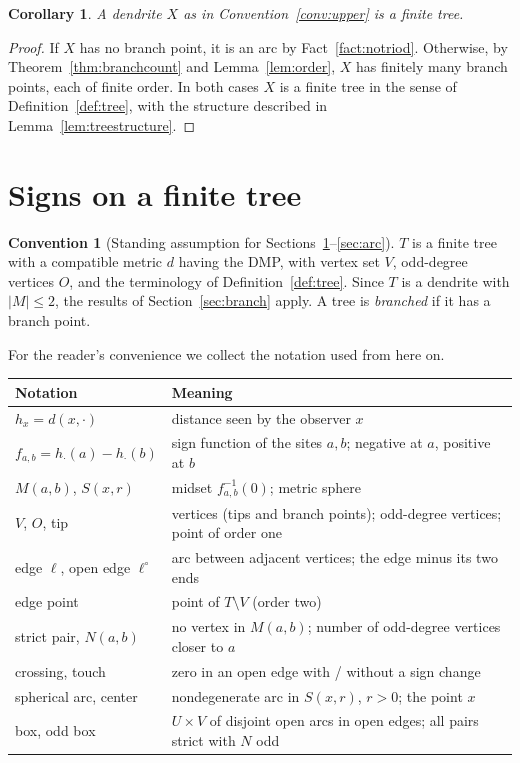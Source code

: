 \documentclass[11pt]{amsart}
\newtheorem{corollary}[theorem]{Corollary}
\theoremstyle{definition}
\newtheorem{convention}[theorem]{Convention}
\theoremstyle{remark}
\newcommand{\M}{M}
\newcommand{\Odd}{O}
\newcommand{\Ver}{V}
\newcommand{\N}{N}
\begin{document}
\begin{corollary}\label{cor:finitetree}
A dendrite $X$ as in Convention~\ref{conv:upper} is a finite tree.
\end{corollary}
\begin{proof}
If $X$ has no branch point, it is an arc by Fact~\ref{fact:notriod}. Otherwise, by Theorem~\ref{thm:branchcount} and Lemma~\ref{lem:order}, $X$ has finitely many branch points, each of finite order. In both cases $X$ is a finite tree in the sense of Definition~\ref{def:tree}, with the structure described in Lemma~\ref{lem:treestructure}.
\end{proof}

\section{Signs on a finite tree}\label{sec:signs}

\begin{convention}[Standing assumption for Sections~\ref{sec:signs}--\ref{sec:arc}]\label{conv:tree}
$T$ is a finite tree with a compatible metric $d$ having the DMP, with vertex set $\Ver$, odd-degree vertices $\Odd$, and the terminology of Definition~\ref{def:tree}. Since $T$ is a dendrite with $|\M|\le2$, the results of Section~\ref{sec:branch} apply. A tree is \emph{branched} if it has a branch point.
\end{convention}

For the reader's convenience we collect the notation used from here on.
\begin{center}
\small
\begin{tabular}{@{}p{}p{}@{}}
\toprule
Notation & Meaning\\
\midrule
$h_x=d(x,\cdot)$ & distance seen by the observer $x$\\
$f_{a,b}=h_\cdot(a)-h_\cdot(b)$ & sign function of the sites $a,b$; negative at $a$, positive at $b$\\
$\M(a,b)$, $S(x,r)$ & midset $f_{a,b}^{-1}(0)$; metric sphere\\
$\Ver$, $\Odd$, tip & vertices (tips and branch points); odd-degree vertices; point of order one\\
edge $\ell$, open edge $\ell^\circ$ & arc between adjacent vertices; the edge minus its two ends\\
edge point & point of $T\setminus\Ver$ (order two)\\
strict pair, $\N(a,b)$ & no vertex in $\M(a,b)$; number of odd-degree vertices closer to $a$\\
crossing, touch & zero in an open edge with / without a sign change\\
spherical arc, center & nondegenerate arc in $S(x,r)$, $r>0$; the point $x$\\
box, odd box & $U\times V$ of disjoint open arcs in open edges; all pairs strict with $\N$ odd\\
\bottomrule
\end{tabular}
\end{center}
\end{document}
